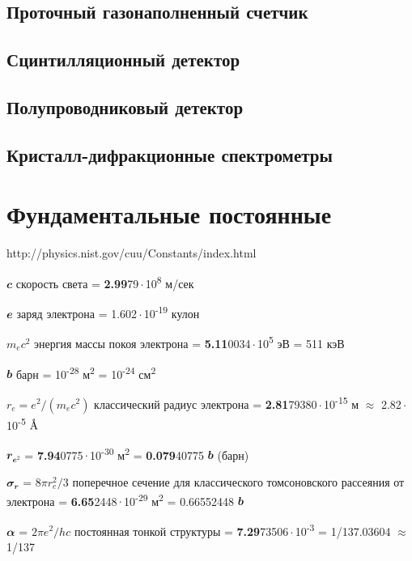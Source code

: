 \documentclass[a4paper,14pt, openany, twoside, draft]{extbook} %
\newcommand{\AAA}{\textup{\AA}}
\begin{document}
\section{Проточный газонаполненный счетчик}
\section{Сцинтилляционный детектор}
\section{Полупроводниковый детектор}
\section{Кристалл-дифракционные спектрометры}

\newpage
\chapter*{Фундаментальные постоянные}
{http://physics.nist.gov/cuu/Constants/index.html}


$\mathbfit{c}$  скорость света =  \textbf{2.99}79\,$\cdot$\,10\textsuperscript{8} м/сек %

$\mathbfit{e}$  заряд электрона = 1.602\,$\cdot$\,10\textsuperscript{-19} кулон

$m_ec^2$  энергия массы покоя электрона = \textbf{5.11}0034\,$\cdot$\,10\textsuperscript{5} эВ = 511 кэВ

$\mathbfit{b}$  барн = 10\textsuperscript{-28} м\textsuperscript{2} = 10\textsuperscript{-24} см\textsuperscript{2}

$r_e=e^2/(m_ec^2)$  классический радиус электрона = \textbf{2.81}79380\,$\cdot$\,10\textsuperscript{-15} м $\approx$ 2.82\,$\cdot$\,10\textsuperscript{-5} $\AAA$

$\mathbfit{r_{e^2}}$ = \textbf{7.94}0775\,$\cdot$\,10\textsuperscript{-30} м\textsuperscript{2}  = \textbf{0.079}40775 $\mathbfit{b}$ (барн)

$\mathbfit{\sigma_r}$ = $8\pi r_e^2/3$ поперечное сечение для классического томсоновского рассеяния от электрона = \textbf{6.65}2448\,$\cdot$\,10\textsuperscript{-29} м\textsuperscript{2} = 0.66552448 $\mathbfit{b}$

$\mathbfit{\alpha}$ = $2\pi e^2/hc$ постоянная тонкой структуры = \textbf{7.29}73506\,$\cdot$\,10\textsuperscript{-3} = 1/137.03604 $\approx$ 1/137
\end{document}
